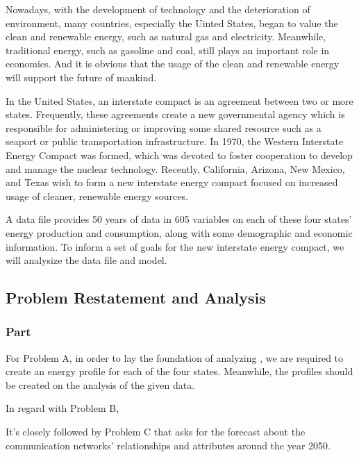 \documentclass[a4paper,11pt]{article}
\begin{document}
\par Nowadays, with the development of technology and the deterioration of environment, many countries, especially the Uinted States, began to value the clean and renewable energy, such as natural gas and electricity. Meanwhile, traditional energy, such as gasoline and coal, still plays an important role in economics. And it is obvious that the usage of the clean and renewable energy will support the future of mankind.
\par In the United States, an interstate compact is an agreement between two or more states. Frequently, these agreements create a new governmental agency which is responsible for administering or improving some shared resource such as a seaport or public transportation infrastructure.\cite{1} In 1970, the Western Interstate Energy Compact was formed, which was devoted to foster cooperation to develop and manage the nuclear technology. Recently, California, Arizona, New Mexico, and Texas wish to form a new interstate energy compact focused on increased usage of cleaner, renewable energy sources. 
\par A data file provides 50 years of data in 605 variables on each of these four states' energy production and consumption, along with some demographic and economic information. To inform a set of goals for the new interstate energy compact, we will analysize the data file and model.





\subsection{Problem Restatement and Analysis}
\subsubsection{Part \uppercase\expandafter{}}
\par For Problem A, in order to lay the foundation of analyzing , we are required to create an energy profile for each of the four states. Meanwhile, the profiles should be created on the analysis of the given data.

\par In regard with Problem B, 

\par It's closely followed by Problem C that asks for the forecast about the communication networks' relationships and attributes around the year 2050. 
\end{document}
